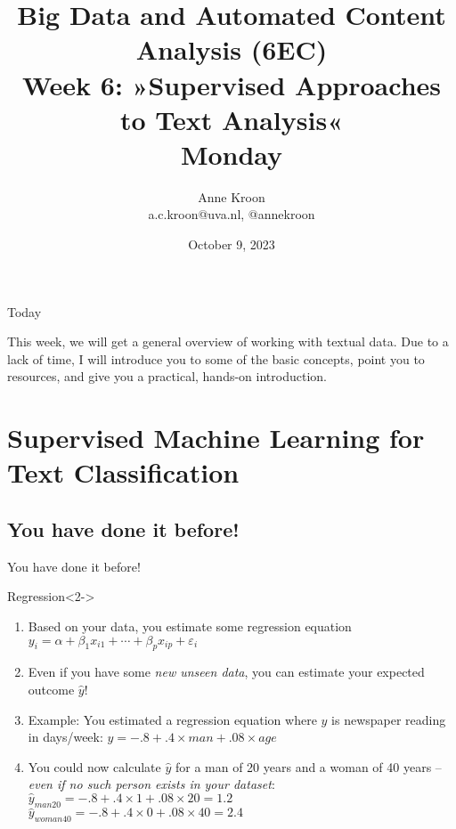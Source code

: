 

\graphicspath{{../../resources/img/}}




\title[Big Data and Automated Content Analysis]{\textbf{Big Data and Automated Content Analysis (6EC)} 
\\Week 6: »Supervised Approaches to Text Analysis«
\\Monday}
\author[Anne Kroon]{Anne Kroon\\ \footnotesize{a.c.kroon@uva.nl, @annekroon \\}}
\date{October 9, 2023}


\begin{frame}{}
	\titlepage
\end{frame}

\begin{frame}{Today}
	\tableofcontents
\end{frame}



\begin{frame}[standout]
This week, we will get a general overview of working with textual data. Due to a lack of time, I will introduce you to some of the basic concepts, point you to resources, and give you a practical, hands-on introduction. 
\end{frame}


\section{Supervised Machine Learning for Text Classification}

\subsection{You have done it before!}
\begin{frame}{You have done it before!}
	\begin{block}{Regression}<2->
		\begin{enumerate}
			\item<3-> Based on your data, you estimate some regression equation 	$y_i = \alpha + \beta_1 x_{i1} + \cdots + \beta_p x_{ip} + \varepsilon_i$
			\item<4-> Even if you have some \emph{new unseen data}, you can estimate your expected outcome $\hat{y}$!
			\item<5-> Example: You estimated a regression equation where $y$ is newspaper reading in days/week: $y = -.8 + .4 \times man + .08 \times age$
			\item<6-> You could now calculate $\hat{y}$ for a man of 20 years and a woman of 40 years -- \emph{even if no such person exists in your dataset}: \\
			$\hat{y}_{man20} = -.8 + .4 \times 1 + .08 \times 20 = 1.2$ \\
			$\hat{y}_{woman40} = -.8 + .4 \times 0 + .08 \times 40 = 2.4$
		\end{enumerate}
	\end{block}	
	
\end{frame}

